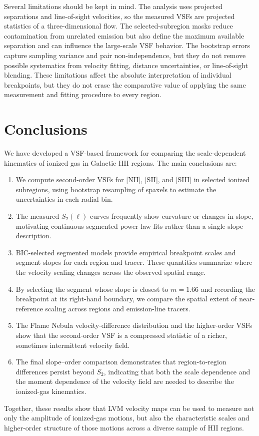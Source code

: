 Several limitations should be kept in mind. The analysis uses projected
separations and line-of-sight velocities, so the measured VSFs are projected
statistics of a three-dimensional flow. The selected-subregion masks reduce
contamination from unrelated emission but also define the maximum available
separation and can influence the large-scale VSF behavior. The bootstrap errors
capture sampling variance and pair non-independence, but they do not remove
possible systematics from velocity fitting, distance uncertainties, or
line-of-sight blending. These limitations affect the absolute interpretation of
individual breakpoints, but they do not erase the comparative value of applying
the same measurement and fitting procedure to every region.

\section{Conclusions}
\label{sec:conclusions}

We have developed a VSF-based framework for comparing the scale-dependent
kinematics of ionized gas in Galactic HII regions. The main conclusions are:
\begin{enumerate}
    \item We compute second-order VSFs for [NII], [SII], and [SIII] in selected
    ionized subregions, using bootstrap resampling of spaxels to estimate the
    uncertainties in each radial bin.
    \item The measured $S_2(\ell)$ curves frequently show curvature or changes
    in slope, motivating continuous segmented power-law fits rather than a
    single-slope description.
    \item BIC-selected segmented models provide empirical breakpoint scales and
    segment slopes for each region and tracer. These quantities summarize where
    the velocity scaling changes across the observed spatial range.
    \item By selecting the segment whose slope is closest to $m=1.66$ and
    recording the breakpoint at its right-hand boundary, we compare the spatial
    extent of near-reference scaling across regions and emission-line tracers.
    \item The Flame Nebula velocity-difference distribution and the higher-order
    VSFs show that the second-order VSF is a compressed statistic of a richer,
    sometimes intermittent velocity field.
    \item The final slope--order comparison demonstrates that region-to-region
    differences persist beyond $S_2$, indicating that both the scale dependence
    and the moment dependence of the velocity field are needed to describe the
    ionized-gas kinematics.
\end{enumerate}

Together, these results show that LVM velocity maps can be used to measure not
only the amplitude of ionized-gas motions, but also the characteristic scales
and higher-order structure of those motions across a diverse sample of HII
regions.
